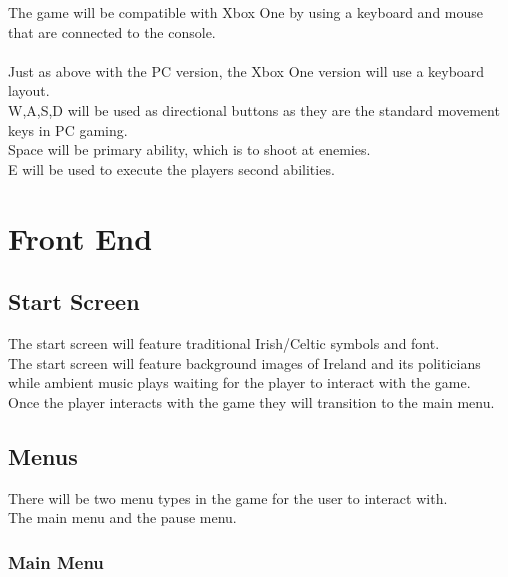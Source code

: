 \documentclass[a4paper]{scrreprt}
\begin{document}
The game will be compatible with Xbox One by using a keyboard and mouse that are connected to the console. \\\\
Just as above with the PC version, the Xbox One version will use a keyboard layout. \\
W,A,S,D will be used as directional buttons as they are the standard movement keys in PC gaming. \\
Space will be primary ability, which is to shoot at enemies. \\
E will be used to execute the players second abilities.

\chapter{Front End}

\section{Start Screen}

The start screen will feature traditional Irish/Celtic symbols and font.\\
The start screen will feature background images of Ireland and its politicians while ambient music plays waiting for the player to interact with the game.\\
Once the player interacts with the game they will transition to the main menu.

\section{Menus}

There will be two menu types in the game for the user to interact with.\\
The main menu and the pause menu.

\subsection{Main Menu}
\end{document}
